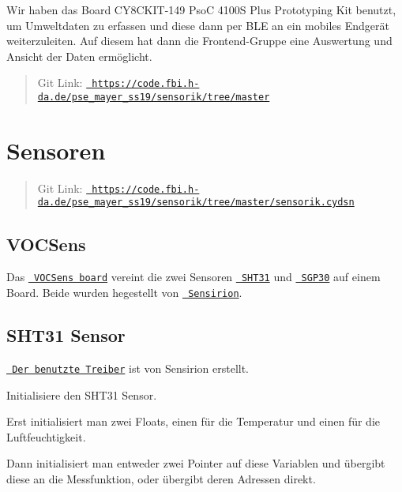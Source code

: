 Wir haben das Board C\+Y8\+C\+K\+I\+T-\/149 PsoC 4100S Plus Prototyping Kit benutzt, um Umweltdaten zu erfassen und diese dann per B\+LE an ein mobiles Endgerät weiterzuleiten. Auf diesem hat dann die Frontend-\/\+Gruppe eine Auswertung und Ansicht der Daten ermöglicht.

\begin{quote}
Git Link\+: \href{https://code.fbi.h-da.de/pse_mayer_ss19/sensorik/tree/master}{\texttt{ https\+://code.\+fbi.\+h-\/da.\+de/pse\+\_\+mayer\+\_\+ss19/sensorik/tree/master}} \end{quote}
\hypertarget{index_autotoc_md1}{}\section{Sensoren}\label{index_autotoc_md1}
\begin{quote}
Git Link\+: \href{https://code.fbi.h-da.de/pse_mayer_ss19/sensorik/tree/master/sensorik.cydsn}{\texttt{ https\+://code.\+fbi.\+h-\/da.\+de/pse\+\_\+mayer\+\_\+ss19/sensorik/tree/master/sensorik.\+cydsn}} \end{quote}
\hypertarget{index_autotoc_md2}{}\subsection{V\+O\+C\+Sens}\label{index_autotoc_md2}
Das \href{https://www.glyn.de/Produkte/Sensoren/VOCSens}{\texttt{ V\+O\+C\+Sens board}} vereint die zwei Sensoren \href{https://www.sensirion.com/en/environmental-sensors/humidity-sensors/digital-humidity-sensors-for-various-applications/}{\texttt{ S\+H\+T31}} und \href{https://www.sensirion.com/de/umweltsensoren/gassensoren/multipixel-gassensoren/}{\texttt{ S\+G\+P30}} auf einem Board. Beide wurden hegestellt von \href{https://www.sensirion.com/en/}{\texttt{ Sensirion}}.\hypertarget{index_autotoc_md3}{}\subsection{S\+H\+T31 Sensor}\label{index_autotoc_md3}
\href{https://github.com/Sensirion/embedded-sht}{\texttt{ Der benutzte Treiber}} ist von Sensirion erstellt.

Initialisiere den S\+H\+T31 Sensor.

Erst initialisiert man zwei Floats, einen für die Temperatur und einen für die Luftfeuchtigkeit.

Dann initialisiert man entweder zwei Pointer auf diese Variablen und übergibt diese an die Messfunktion, oder übergibt deren Adressen direkt.

